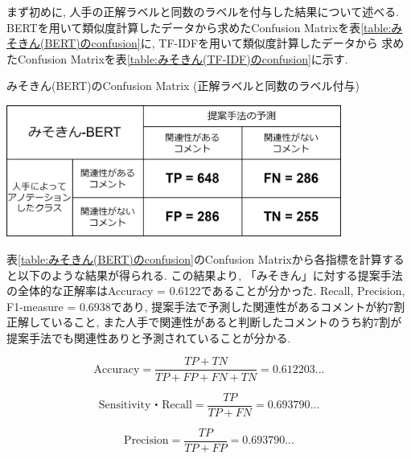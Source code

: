\documentclass{ltjarticle}
\begin{document}
まず初めに, 人手の正解ラベルと同数のラベルを付与した結果について述べる. 
BERTを用いて類似度計算したデータから求めたConfusion Matrixを表\ref{table:みそきん(BERT)のconfusion}に, TF-IDFを用いて類似度計算したデータから
求めたConfusion Matrixを表\ref{table:みそきん(TF-IDF)のconfusion}に示す. 

\newpage
\begin{table}[ht]
    \centering
    \caption{みそきん(BERT)のConfusion Matrix (正解ラベルと同数のラベル付与)}
    \vspace{5truept}

    \includegraphics[width = 11cm]{images/みそきん行列.drawio.png}
    \label{table:みそきん(BERT)のconfusion}
\end{table}
\vspace{10truept}

表\ref{table:みそきん(BERT)のconfusion}のConfusion Matrixから各指標を計算すると以下のような結果が得られる. 
この結果より,  「みそきん」に対する提案手法の全体的な正解率はAccuracy = 0.6122であることが分かった. 
Recall, Precision, F1-measure = 0.6938であり, 提案手法で予測した関連性があるコメントが約7割正解していること, 
また人手で関連性があると判断したコメントのうち約7割が提案手法でも関連性ありと予測されていることが分かる. 
\vspace{10truept}

\begin{equation}
    \textrm{Accuracy} = \dfrac{TP+TN}{TP+FP+FN+TN} = 0.612203...
\end{equation}
\vspace{5truept}

\begin{equation}
    \textrm{Sensitivity・Recall} = \dfrac{TP}{TP+FN} = 0.693790...
\end{equation}
\vspace{5truept}

\begin{equation}
    \textrm{Precision} = \dfrac{TP}{TP+FP} = 0.693790...
\end{equation}
\vspace{5truept}
\end{document}

